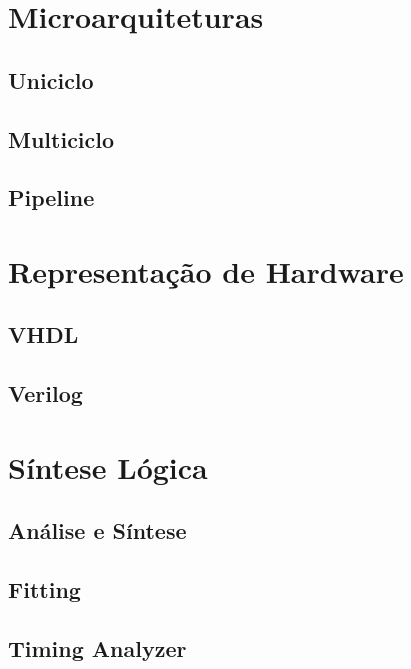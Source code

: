 \section{Microarquiteturas}
{}

    \subsection{Uniciclo}
    {}

    \subsection{Multiciclo}
    {}

    \subsection{Pipeline}
    {}

\section{Representação de Hardware}
{}

    \subsection{VHDL}
    {}

    \subsection{Verilog}
    {}

\section{Síntese Lógica}
{}

    \subsection{Análise e Síntese}
    {}

    \subsection{Fitting}
    {}

    \subsection{Timing Analyzer}
    {}


